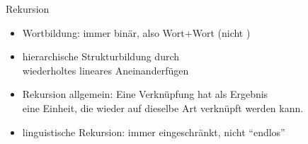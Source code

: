 \begin{frame}[fragile]
  {Rekursion}
  \pause
  \begin{itemize}[<+->]
    \item Wortbildung: immer \alert{binär}, also \alert{Wort+Wort} (nicht )
      \Viertelzeile
    \item \alert{hierarchische Strukturbildung} durch \\
      wiederholtes lineares Aneinanderfügen
      \Viertelzeile
    \item Rekursion allgemein: \alert{Eine Verknüpfung hat als Ergebnis\\
      eine Einheit, die wieder auf dieselbe Art verknüpft werden kann.}
    \item linguistische Rekursion: immer eingeschränkt, nicht "`endlos"'
  \end{itemize}
  \pause
  \begin{center}
    \scalebox{0.7}{
      \begin{forest}
        [Bushaltestellenunterstandsreparatur
          [Bushaltestellenunterstand
            [Bushaltestelle
              [Bus]
              [Haltestelle
                [halten]
                [Stelle]
              ]
            ]
            [Unterstand
              [unter]
              [Stand]
            ]
          ]
          [Reparatur]
        ]
      \end{forest}
    }
  \end{center}
\end{frame}

